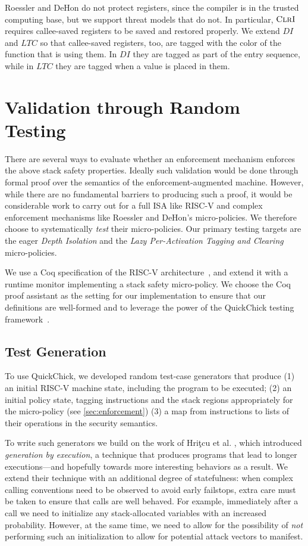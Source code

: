 \documentclass[10pt,conference]{ieeetran}%
\theoremstyle{definition}
\begin{document}
Roessler and DeHon do not protect registers, since the compiler is in the
trusted computing base, but we support threat models that do not.
In particular, \(\textnormal{\sc ClrI}\) requires callee-saved
registers to be saved and restored properly. We extend \(DI\) and \(LTC\)
so that callee-saved registers, too, are tagged with the color of the
function that is using them. In \(DI\) they are tagged as part of the entry
sequence, while in \(LTC\) they are tagged when a value is placed in them.

\section{Validation through Random Testing}
\label{sec:testing}

There are several ways to evaluate whether an enforcement mechanism enforces the above
stack safety properties. Ideally such validation would be done through formal proof over
the semantics of the enforcement-augmented machine.
However, while there are no fundamental barriers to producing such a proof,
it would be considerable work to carry out for a full ISA like RISC-V and
complex enforcement mechanisms like Roessler and DeHon's micro-policies.
We therefore choose to systematically \emph{test} their micro-policies.
Our primary testing targets are the eager {\em Depth Isolation}
and the {\em Lazy Per-Activation Tagging and Clearing} micro-policies.


We use a Coq specification of the RISC-V architecture~\cite{Bourgeat2021AMF},
and extend it with a runtime monitor implementing a stack safety
micro-policy. We choose the Coq proof assistant as the setting for our implementation
to ensure that our definitions are well-formed and to leverage the
power of the QuickChick %
testing framework~\cite{Pierce:SF4}.

\subsection{Test Generation}
To use QuickChick, we developed random test-case generators that produce
(1) an initial RISC-V machine state, including the program to be executed;
(2)
  an initial policy state, tagging instructions and the stack regions appropriately
  for the micro-policy (see \cref{sec:enforcement})
(3)
  a map from instructions to lists of their operations in the security semantics.

To write such generators we build on the work of Hri\c{t}cu et
al. \cite{TestingNI:ICFP, DBLP:journals/jfp/HritcuLSADHPV16}, which
introduced {\em generation by execution}, a technique that produces
programs that lead to longer executions---and hopefully towards more
interesting behaviors as a result. We extend their technique with an additional
degree of statefulness: when complex calling conventions need to be
observed to avoid early failstops, extra care must be taken to ensure
that %
calls are well behaved. For example, immediately
after a call we need to initialize any stack-allocated variables
with an increased probability. However, at the same time, we need to
allow for the possibility of {\em not} performing such an initialization
to allow for potential attack vectors to manifest.
\end{document}
